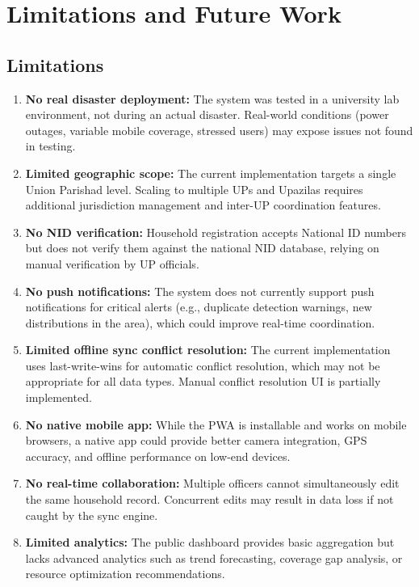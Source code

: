 \chapter{Limitations and Future Work}

\section{Limitations}

\begin{enumerate}[leftmargin=1.2cm]
    \item \textbf{No real disaster deployment:} The system was tested in a university lab environment, not during an actual disaster. Real-world conditions (power outages, variable mobile coverage, stressed users) may expose issues not found in testing.

    \item \textbf{Limited geographic scope:} The current implementation targets a single Union Parishad level. Scaling to multiple UPs and Upazilas requires additional jurisdiction management and inter-UP coordination features.

    \item \textbf{No NID verification:} Household registration accepts National ID numbers but does not verify them against the national NID database, relying on manual verification by UP officials.

    \item \textbf{No push notifications:} The system does not currently support push notifications for critical alerts (e.g., duplicate detection warnings, new distributions in the area), which could improve real-time coordination.

    \item \textbf{Limited offline sync conflict resolution:} The current implementation uses last-write-wins for automatic conflict resolution, which may not be appropriate for all data types. Manual conflict resolution UI is partially implemented.

    \item \textbf{No native mobile app:} While the PWA is installable and works on mobile browsers, a native app could provide better camera integration, GPS accuracy, and offline performance on low-end devices.

    \item \textbf{No real-time collaboration:} Multiple officers cannot simultaneously edit the same household record. Concurrent edits may result in data loss if not caught by the sync engine.

    \item \textbf{Limited analytics:} The public dashboard provides basic aggregation but lacks advanced analytics such as trend forecasting, coverage gap analysis, or resource optimization recommendations.
\end{enumerate}

